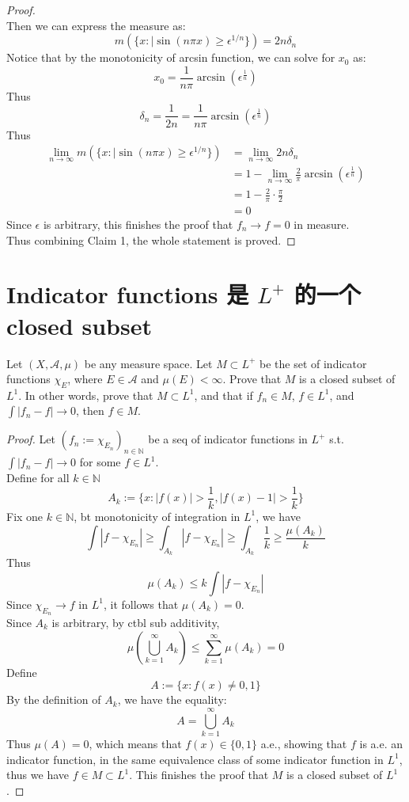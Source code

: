 \documentclass[lang=cn,11pt]{elegantbook}
\begin{document}
\begin{proof}
\[\]
Then we can express the measure as: \[
m(\{ x: |\sin (n \pi x) \geq \epsilon^{1/n}  \}) = 2n  \delta_n
\]
Notice that by the monotonicity of arcsin function, we can solve for $x_0$ as:\[
x_0  =\frac{1}{n\pi} \arcsin (\epsilon^\frac{1}{n})
\]
Thus \[
\delta_n = \frac{1}{2n} = \frac{1}{n\pi} \arcsin (\epsilon^\frac{1}{n})
\]
Thus  \begin{align}
\lim_{n\to \infty}m(\{ x: |\sin (n \pi x) \geq \epsilon^{1/n}  \}) &=  \lim_{n\to\infty} 2n  \delta_n     \\
&= 1-  \lim_{n\to\infty}  \frac{2}{\pi}\arcsin (\epsilon^\frac{1}{n}) \\
&= 1-\frac{2}{\pi} \cdot \frac{\pi}{2} \\
&=0
\end{align}
Since $\epsilon$ is arbitrary, this finishes the proof that $f_n \to f = 0$ in measure.\\
Thus combining Claim 1, the whole statement is proved.
\end{proof}





\section{Indicator functions 是 $L^+$ 的一个 closed subset}
  Let $(X,\mathcal{A},\mu)$ be any measure space. Let $M\subset L^+$ be the set of indicator functions $\chi_E$, where $E\in\mathcal{A}$ and $\mu(E)<\infty$. Prove that $M$ is a closed subset of $L^1$. In other words, prove that $M\subset L^1$, and that if $f_n\in M$, $f\in L^1$, and $\int|f_n-f|\to0$, then $f\in M$.

\begin{proof}
Let $(f_n := \chi_{E_n})_{n\in\mathbb{N}}$ be a seq of indicator functions in $L^+$ s.t. $\int|f_n-f|\to0$ for some $f\in L^1$.  \\
Define for all $k\in \mathbb{N}$ $$
A_k :=\{x\colon |f(x)|>\frac{1}{k},|f(x)-1|>\frac{1}{k}\}
$$
Fix one $k\in\mathbb{N}$, bt monotonicity of integration in $L^1$, we have
$$\int|f-\chi_{E_n}|\geq \int_{A_k}|f-\chi_{E_n}|\geq   \int_{A_k} \frac{1}{k}   \geq     \frac{\mu(A_k)}{k}$$
Thus \[
\mu(A_k) \leq k \int |f-\chi_{E_n}|
\]
Since $\chi_{E_n}\to f$ in $L^1$, it follows that $\mu(A_k)=0$.\\
Since $A_k$ is arbitrary, by ctbl sub additivity, \[
\mu(\bigcup_{k=1}^{\infty}A_k) \leq \sum_{k=1}^{\infty}\mu(A_k)= 0 
\]
Define \[
A:=\{x\colon f(x)\not=0,1\}
\]
By the definition of $A_k$, we have the equality: \[
A=\bigcup_{k=1}^{\infty}A_k
\]
Thus $\mu(A) = 0$, which means that $f(x)\in\{0,1\}$ a.e., showing that $f$ is a.e. an indicator function, in the same equivalence class of some indicator function in $L^1$, thus we have $f \in M \subset L^1$. This finishes the proof that $M$ is a closed subset of $L^1$.
\end{proof}
\end{document}
